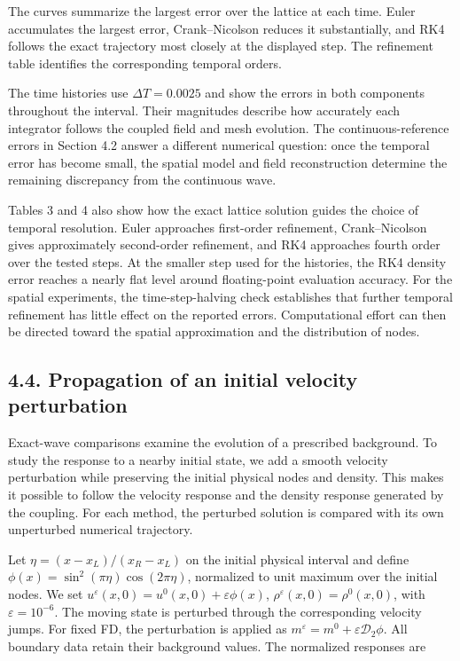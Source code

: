 \documentclass[11pt,a4paper]{article}
\begin{document}
The curves summarize the largest error over the lattice at each time. Euler accumulates the largest error, Crank–Nicolson reduces it substantially, and RK4 follows the exact trajectory most closely at the displayed step. The refinement table identifies the corresponding temporal orders.

The time histories use \(\Delta T=0.0025\) and show the errors in both components throughout the interval. Their magnitudes describe how accurately each integrator follows the coupled field and mesh evolution. The continuous-reference errors in Section 4.2 answer a different numerical question: once the temporal error has become small, the spatial model and field reconstruction determine the remaining discrepancy from the continuous wave.

Tables 3 and 4 also show how the exact lattice solution guides the choice of temporal resolution. Euler approaches first-order refinement, Crank–Nicolson gives approximately second-order refinement, and RK4 approaches fourth order over the tested steps. At the smaller step used for the histories, the RK4 density error reaches a nearly flat level around floating-point evaluation accuracy. For the spatial experiments, the time-step-halving check establishes that further temporal refinement has little effect on the reported errors. Computational effort can then be directed toward the spatial approximation and the distribution of nodes.

\FloatBarrier
\subsection*{4.4. Propagation of an initial velocity perturbation}

Exact-wave comparisons examine the evolution of a prescribed background. To study the response to a nearby initial state, we add a smooth velocity perturbation while preserving the initial physical nodes and density. This makes it possible to follow the velocity response and the density response generated by the coupling. For each method, the perturbed solution is compared with its own unperturbed numerical trajectory.

Let \(\eta=(x-x_L)/(x_R-x_L)\) on the initial physical interval and define \(\phi(x)=\sin^2(\pi\eta)\cos(2\pi\eta)\), normalized to unit maximum over the initial nodes. We set \(u^\varepsilon(x,0)=u^0(x,0)+\varepsilon\phi(x)\), \(\rho^\varepsilon(x,0)=\rho^0(x,0)\), with \(\varepsilon=10^{-6}\). The moving state is perturbed through the corresponding velocity jumps. For fixed FD, the perturbation is applied as \(m^\varepsilon=m^0+\varepsilon\mathcal D_2\phi\). All boundary data retain their background values. The normalized responses are
\end{document}
